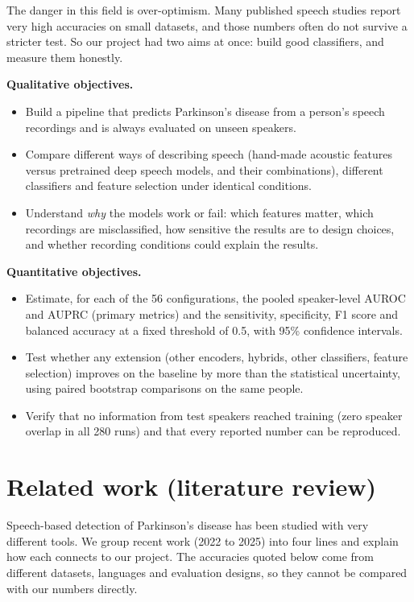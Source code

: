 \documentclass[11pt,a4paper]{article}
\begin{document}
The danger in this field is over-optimism. Many published speech studies report very high accuracies on small datasets, and those numbers often do not survive a stricter test. So our project had two aims at once: build good classifiers, and measure them honestly.

\textbf{Qualitative objectives.}

\begin{itemize}\item Build a pipeline that predicts Parkinson's disease from a person's speech recordings and is always evaluated on unseen speakers.
\item Compare different ways of describing speech (hand-made acoustic features versus pretrained deep speech models, and their combinations), different classifiers and feature selection under identical conditions.
\item Understand \emph{why} the models work or fail: which features matter, which recordings are misclassified, how sensitive the results are to design choices, and whether recording conditions could explain the results.
\end{itemize}
\textbf{Quantitative objectives.}

\begin{itemize}\item Estimate, for each of the 56 configurations, the pooled speaker-level AUROC and AUPRC (primary metrics) and the sensitivity, specificity, F1 score and balanced accuracy at a fixed threshold of 0.5, with 95\% confidence intervals.
\item Test whether any extension (other encoders, hybrids, other classifiers, feature selection) improves on the baseline by more than the statistical uncertainty, using paired bootstrap comparisons on the same people.
\item Verify that no information from test speakers reached training (zero speaker overlap in all 280 runs) and that every reported number can be reproduced.
\end{itemize}
\section{Related work (literature review)}\label{sec:related}
Speech-based detection of Parkinson's disease has been studied with very different tools. We group recent work (2022 to 2025) into four lines and explain how each connects to our project. The accuracies quoted below come from different datasets, languages and evaluation designs, so they cannot be compared with our numbers directly.
\end{document}

